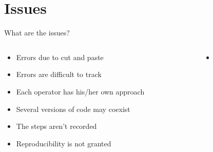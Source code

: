 \documentclass[xcolor=x11names,compress]{beamer}
\renewcommand{\(}{\begin{columns}}
\renewcommand{\)}{\end{columns}}
\newcommand{\<}[1]{\begin{column}{#1}}
\renewcommand{\>}{\end{column}}
\begin{document}
\section{Issues}

\begin{frame}{What are the issues?}
  \begin{columns}[T]
    \begin{column}{0.5\textwidth}
      \begin{itemize}[<+->]
        \item Errors due to cut and paste
        \item Errors are difficult to track
        \item Each operator has his/her own approach
        \item Several versions of code may coexist
        \item The steps aren't recorded
        \item Reproducibility is not granted
      \end{itemize}
    \end{column}
    \begin{column}{0.5\textwidth}
    \begin{itemize}
        \item[]  

\end{itemize}
\end{column}
\end{columns}
\end{frame}
\end{document}
